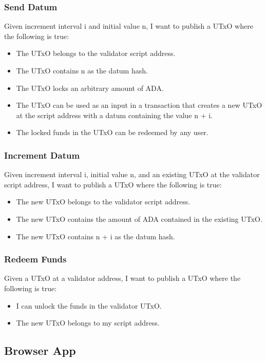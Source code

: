 \documentclass{article}
\begin{document}
\subsubsection{Send Datum}
Given increment interval i and initial value n, I want to publish a UTxO where the following
is true:
\begin{itemize}
  \item The UTxO belongs to the validator script address.
  \item The UTxO contains n as the datum hash.
  \item The UTxO locks an arbitrary amount of ADA.
  \item The UTxO can be used as an input in a transaction that creates a new UTxO at the script
        address with a datum containing the value n + i.
  \item The locked funds in the UTxO can be redeemed by any user.      
\end{itemize}


\subsubsection{Increment Datum}
Given increment interval i, initial value n, and an existing UTxO at the validator script address, 
I want to publish a UTxO where the following is true:
\begin{itemize}
  \item The new UTxO belongs to the validator script address.
  \item The new UTxO contains the amount of ADA contained in the existing UTxO.
  \item The new UTxO contains n + i as the datum hash.    
\end{itemize}

\subsubsection{Redeem Funds}
Given a UTxO at a validator address, I want to publish a UTxO where the following is true:
\begin{itemize}
  \item I can unlock the funds in the validator UTxO.
  \item The new UTxO belongs to my script address.
\end{itemize}

\subsection{Browser App}
\end{document}
